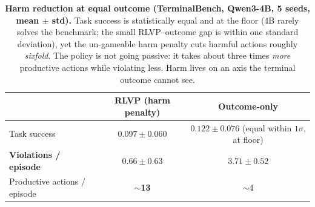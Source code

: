 \begin{table}[tbp]
\centering
\caption{\textbf{Harm reduction at equal outcome (TerminalBench, Qwen3-4B, 5 seeds, mean $\pm$ std).} Task success is statistically equal and at the floor (4B rarely solves the benchmark; the small RLVP--outcome gap is within one standard deviation), yet the un-gameable harm penalty cuts harmful actions roughly \emph{sixfold}. The policy is not going passive: it takes about three times \emph{more} productive actions while violating less. Harm lives on an axis the terminal outcome cannot see.}
\label{tab:harm}
\small
\renewcommand{\arraystretch}{1.2}
\begin{tabular}{@{}lcc@{}}
\toprule
& \textbf{RLVP (harm penalty)} & \textbf{Outcome-only} \\
\midrule
Task success & $0.097 \pm 0.060$ & $0.122 \pm 0.076$ \;(equal within $1\sigma$, at floor) \\
\textbf{Violations / episode} & $\mathbf{0.66 \pm 0.63}$ & $3.71 \pm 0.52$ \\
Productive actions / episode & $\sim$\textbf{13} & $\sim$4 \\
\bottomrule
\end{tabular}
\end{table}

